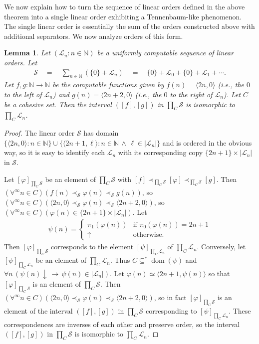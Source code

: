\documentclass[11pt,a4paper,reqno]{amsart}
\newtheorem{Lemma}[Theorem]{Lemma}
\theoremstyle{definition}
\DeclareMathOperator{\dom}{\mathrm{dom}}
\newcommand{\la}{\langle}
\newcommand{\ra}{\rangle}
\newcommand{\da}{{\downarrow}}
\newcommand{\ua}{{\uparrow}}
\newcommand{\imp}{\rightarrow}
\newcommand{\Nb}{\mathbb{N}}
\newcommand{\forae}{\forall^\infty}
\newcommand{\mc}[1]{\mathcal{#1}}
\begin{document}
We now explain how to turn the sequence of linear orders defined in the above theorem into a single linear order exhibiting a Tennenbaum-like phenomenon.  The single linear order is essentially the sum of the orders constructed above with additional separators.  We now analyze orders of this form.

\begin{Lemma}\label{lem-SumInterval}
Let $(\mc{L}_n : n \in \Nb)$ be a uniformly computable sequence of linear orders.  Let
\begin{align*}
\mc{S} \quad=\quad \sum_{n \in \Nb} (\{0\} + \mc{L}_n) \quad=\quad \{0\} + \mc{L}_0 + \{0\} + \mc{L}_1 + \cdots.
\end{align*}
Let $f, g \colon \Nb \to \Nb$ be the computable functions given by $f(n) = \la 2n, 0 \ra$ (i.e., the $0$ to the left of $\mc{L}_n$) and $g(n) = \la 2n+2, 0 \ra$ (i.e., the $0$ to the right of $\mc{L}_n$).  Let $C$ be a cohesive set.  Then the interval $([f], [g])$ in $\prod_C \mc{S}$ is isomorphic to $\prod_C \mc{L}_n$.
\end{Lemma}

\begin{proof}
The linear order $\mc{S}$ has domain $\{\la 2n, 0 \ra : n \in \Nb\} \cup \{\la 2n+1, \ell \ra : n \in \Nb \,\land\, \ell \in |\mc{L}_n|\}$ and is ordered in the obvious way, so it is easy to identify each $\mc{L}_n$ with its corresponding copy $\{2n+1\} \times |\mc{L}_n|$ in $\mc{S}$.

Let $[\varphi]_{\prod_C \mc{S}}$ be an element of $\prod_C \mc{S}$ with $[f] \prec_{\prod_C \mc{S}} [\varphi] \prec_{\prod_C \mc{S}} [g]$.  Then  $(\forae n \in C)(f(n) \prec_{\mc S} \varphi(n) \prec_{\mc S} g(n))$, so $(\forae n \in C)(\la 2n, 0 \ra \prec_{\mc S} \varphi(n) \prec_{\mc S} \la 2n+2, 0 \ra)$, so $(\forae n \in C)(\varphi(n) \in \{2n+1\} \times |\mc{L}_n|)$.  Let 
\begin{align*}
\psi(n) =
\begin{cases}
\pi_1(\varphi(n)) & \text{if $\pi_0(\varphi(n)) = 2n+1$}\\
\ua & \text{otherwise}.
\end{cases}
\end{align*}
Then $[\varphi]_{\prod_C \mc{S}}$ corresponds to the element $[\psi]_{\prod_C \mc{L}_n}$ of $\prod_C \mc{L}_n$.  Conversely, let $[\psi]_{\prod_C \mc{L}_n}$ be an element of $\prod_C \mc{L}_n$.  Thus $C \subseteq^* \dom(\psi)$ and $\forall n\, (\psi(n)\da \,\imp\, \psi(n) \in |\mc{L}_n|)$.  Let $\varphi(n) \simeq \la 2n+1, \psi(n) \ra$ so that $[\varphi]_{\prod_C \mc{S}}$ is an element of $\prod_C \mc{S}$.  Then $(\forae n \in C)(\la 2n, 0 \ra \prec_{\mc S} \varphi(n) \prec_{\mc S} \la 2n+2, 0 \ra)$, so in fact $[\varphi]_{\prod_C \mc{S}}$ is an element of the interval $([f], [g])$ in $\prod_C \mc{S}$ corresponding to $[\psi]_{\prod_C \mc{L}_n}$.  These correspondences are inverses of each other and preserve order, so the interval $([f], [g])$ in $\prod_C \mc{S}$ is isomorphic to $\prod_C \mc{L}_n$.
\end{proof}
\end{document}
